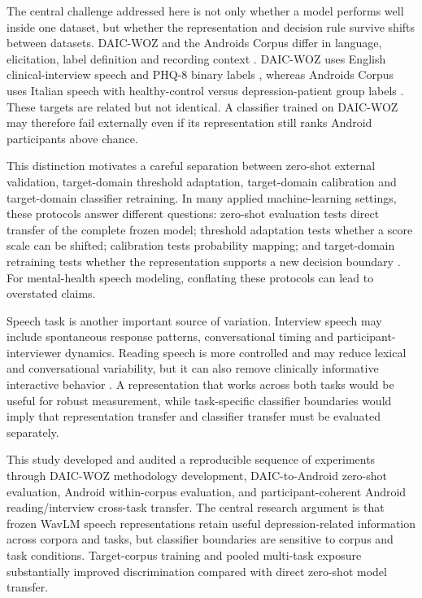 \documentclass[lettersize,journal]{IEEEtran}
\begin{document}
The central challenge addressed here is not only whether a model performs well inside one dataset, but whether the representation and decision rule survive shifts between datasets. DAIC-WOZ and the Androids Corpus differ in language, elicitation, label definition and recording context \cite{gratch2014distress,valstar2016avec,tao2023androids}. DAIC-WOZ uses English clinical-interview speech and PHQ-8 binary labels \cite{gratch2014distress,valstar2016avec,kroenke2009phq8}, whereas Androids Corpus uses Italian speech with healthy-control versus depression-patient group labels \cite{tao2023androids}. These targets are related but not identical. A classifier trained on DAIC-WOZ may therefore fail externally even if its representation still ranks Android participants above chance.

This distinction motivates a careful separation between zero-shot external validation, target-domain threshold adaptation, target-domain calibration and target-domain classifier retraining. In many applied machine-learning settings, these protocols answer different questions: zero-shot evaluation tests direct transfer of the complete frozen model; threshold adaptation tests whether a score scale can be shifted; calibration tests probability mapping; and target-domain retraining tests whether the representation supports a new decision boundary \cite{morenoTorres2012datasetShift,niculescuMizil2005probabilities,vanCalster2019calibration}. For mental-health speech modeling, conflating these protocols can lead to overstated claims.

Speech task is another important source of variation. Interview speech may include spontaneous response patterns, conversational timing and participant-interviewer dynamics. Reading speech is more controlled and may reduce lexical and conversational variability, but it can also remove clinically informative interactive behavior \cite{tao2023androids,tao2023featureCorrelation,leal2025survey}. A representation that works across both tasks would be useful for robust measurement, while task-specific classifier boundaries would imply that representation transfer and classifier transfer must be evaluated separately.

This study developed and audited a reproducible sequence of experiments through DAIC-WOZ methodology development, DAIC-to-Android zero-shot evaluation, Android within-corpus evaluation, and participant-coherent Android reading/interview cross-task transfer. The central research argument is that frozen WavLM speech representations retain useful depression-related information across corpora and tasks, but classifier boundaries are sensitive to corpus and task conditions. Target-corpus training and pooled multi-task exposure substantially improved discrimination compared with direct zero-shot model transfer.
\end{document}

